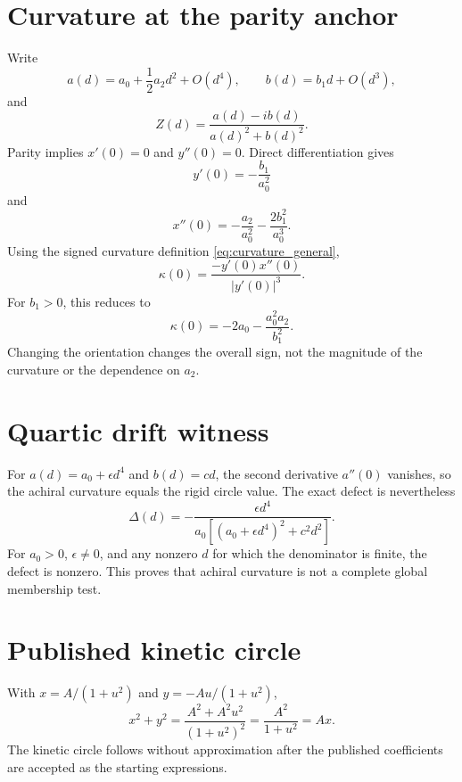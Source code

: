 \section{Curvature at the parity anchor}
Write
\begin{equation}
 a(d)=a_0+\frac12a_2d^2+O(d^4),
 \qquad
 b(d)=b_1d+O(d^3),
\end{equation}
and
\begin{equation}
 Z(d)=\frac{a(d)-ib(d)}{a(d)^2+b(d)^2}.
\end{equation}
Parity implies $x'(0)=0$ and $y''(0)=0$. Direct differentiation gives
\begin{equation}
 y'(0)=-\frac{b_1}{a_0^2}
\end{equation}
and
\begin{equation}
 x''(0)=-\frac{a_2}{a_0^2}-\frac{2b_1^2}{a_0^3}.
\end{equation}
Using the signed curvature definition \cref{eq:curvature_general},
\begin{equation}
 \kappa(0)=
 \frac{-y'(0)x''(0)}{|y'(0)|^3}.
\end{equation}
For $b_1>0$, this reduces to
\begin{equation}
 \kappa(0)=-2a_0-\frac{a_0^2a_2}{b_1^2}.
\end{equation}
Changing the orientation changes the overall sign, not the magnitude of the curvature or the dependence on $a_2$.

\section{Quartic drift witness}
For $a(d)=a_0+\epsilon d^4$ and $b(d)=cd$, the second derivative $a''(0)$ vanishes, so the achiral curvature equals the rigid circle value. The exact defect is nevertheless
\begin{equation}
 \Delta(d)=
 -\frac{\epsilon d^4}
 {a_0[(a_0+\epsilon d^4)^2+c^2d^2]}.
\end{equation}
For $a_0>0$, $\epsilon\ne0$, and any nonzero $d$ for which the denominator is finite, the defect is nonzero. This proves that achiral curvature is not a complete global membership test.

\section{Published kinetic circle}
With $x=A/(1+u^2)$ and $y=-Au/(1+u^2)$,
\begin{equation}
 x^2+y^2
 =\frac{A^2+A^2u^2}{(1+u^2)^2}
 =\frac{A^2}{1+u^2}=Ax.
\end{equation}
The kinetic circle follows without approximation after the published coefficients are accepted as the starting expressions.


